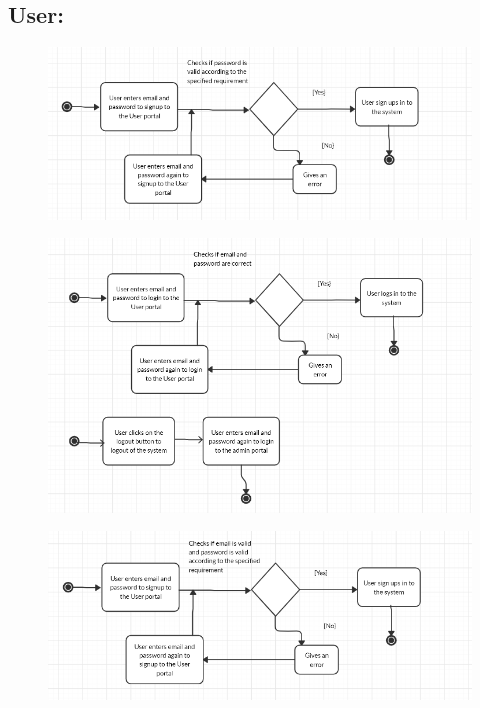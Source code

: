 \subsection{User:}
\begin{figure}[!hb]
   \centering

   \includegraphics[scale=0.4]{images/User.PNG}
\end{figure}
\begin{figure}[!hb]
   \centering

   \includegraphics[scale=0.4]{images/User_1.PNG}
\end{figure}
\begin{figure}[!hb]
   \centering

   \includegraphics[scale=0.4]{images/User_2.PNG}
\end{figure}
